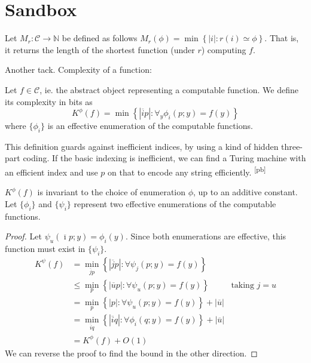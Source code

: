 \documentclass{style/llncs}
\newcommand{\pb}[1]{\textcolor{OliveGreen}{\small #1 \textsuperscript{[pb]} }}
\newcommand{\N}{{\mathbb N}}
\newcommand{\C}{{\mathscr C}}
\newcommand{\s}[1]{{\overline{#1}}}
\begin{document}
\section{Sandbox}

\begin{definition}
Let $M_r: \C \rightarrow \N$ be defined as follows $M_r(\phi) = \min\left \{|i| : r(i) \simeq \phi\right \}$. That is, it returns the length of the shortest function (under $r$) computing $f$.
\end{definition}

Another tack. Complexity of a function:

\begin{definition}
Let $f \in \C$, ie. the abstract object representing a computable function. We define its complexity in bits as
\[
	K^\phi(f) = \min \left\{ |\s{i}p| : \forall_y \phi_i(p ; y) = f(y) \right\}
\] where $\{\phi_i\}$ is an effective enumeration of the computable functions.  
\end{definition}

\pb{This definition guards against inefficient indices, by using a kind of hidden three-part coding. If the basic indexing is inefficient, we can find a Turing machine with an efficient index and use $p$ on that to encode any string efficiently.}

\begin{theorem}
$K^\phi(f)$ is invariant to the choice of enumeration $\phi$, up to an additive constant. Let $\{\phi_i\}$ and $\{\psi_i\}$ represent two effective enumerations of the computable functions.
\end{theorem} 
\begin{proof}
Let $\psi_u(\s{\imath}p; y) = \phi_i(y)$. Since both enumerations are effective, this function must exist in $\{\psi_i\}$.
\begin{align*}
K^\psi(f) &= \min_{\s{j}p}\left\{|\s{j}p| : \forall \psi_j(p ; y) = f(y)\right\} \\
&\leq  \min_{p}\left\{|\s{u}p| : \forall \psi_u(p ; y) = f(y)\right\} & \text{taking $j = u$}\\
&= \min_{p}\left\{|p| : \forall \psi_u(p ; y) = f(y)\right\} + |\s{u}| \\
&= \min_{\s{i}q}\left\{|\s{i}q| : \forall \phi_i(q ; y) = f(y)\right\} + |\s{u}| \\
&= K^\phi(f) + O(1)
\end{align*}
We can reverse the proof to find the bound in the other direction.
\end{proof}
\end{document}
